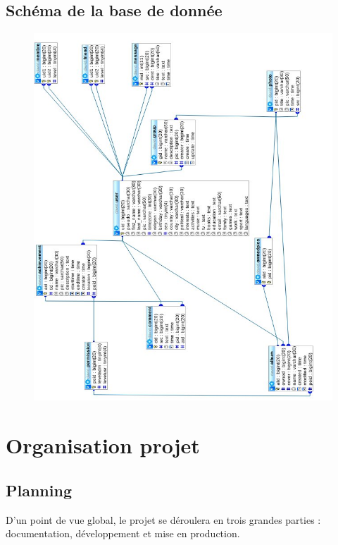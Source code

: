\documentclass{life-fr}
\begin{document}
\section{Schéma de la base de donnée}

\begin{figure}[H]
  \begin{center}
    \includegraphics[width=18cm]{img/imgdb.jpg}
  \end{center}
\end{figure}

\chapter{Organisation projet}

\section{Planning}

D'un point de vue global, le projet se déroulera en trois grandes parties : documentation, développement et mise en production.\\
\end{document}
